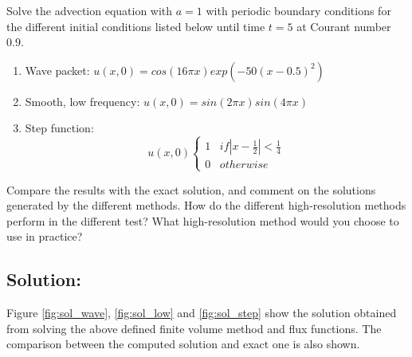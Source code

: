 Solve the advection equation with $a=1$ with periodic boundary conditions for the different initial conditions listed below until time $t=5$ at Courant number 0.9.
\begin{enumerate}
\item Wave packet: $u(x,0)=cos(16\pi x)exp(-50(x-0.5)^2)$
\item Smooth, low frequency: $u(x,0)=sin(2\pi x)sin(4\pi x)$
\item Step function: $$u(x,0)\begin{cases}
							1 \;\;\; if |x-\frac{1}{2}|<\frac{1}{4}\\
							0 \;\;\; otherwise
							\end{cases}$$						
\end{enumerate}
Compare the results with the exact solution, and comment on the solutions generated by the different methods. How do the different high-resolution methods perform in the different test? What high-resolution method would you choose to use in practice?
\subsection{Solution:}
Figure \ref{fig:sol_wave}, \ref{fig:sol_low} and \ref{fig:sol_step} show the solution obtained from solving the above defined finite volume method and flux functions. The comparison between the computed solution and exact one is also shown. 

